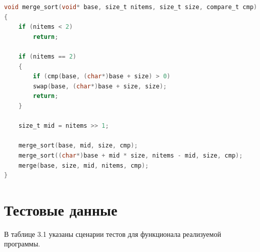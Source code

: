 \begin{lstlisting}[label=merge_sort,language=C,caption=Сортировка слиянием]
void merge_sort(void* base, size_t nitems, size_t size, compare_t cmp)
{
	if (nitems < 2)
		return;
	
	if (nitems == 2)
	{
		if (cmp(base, (char*)base + size) > 0)
		swap(base, (char*)base + size, size);
		return;
	}
	
	size_t mid = nitems >> 1;
	
	merge_sort(base, mid, size, cmp);
	merge_sort((char*)base + mid * size, nitems - mid, size, cmp);
	merge(base, size, mid, nitems, cmp);
}
\end{lstlisting}

\pagebreak

\section{Тестовые данные}

В таблице 3.1 указаны сценарии тестов для функционала реализуемой программы.

